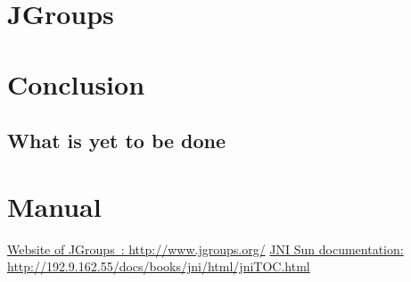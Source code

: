 \documentclass[a4paper,10pt]{report}
\begin{document}
\chapter{JGroups}
\section{}


\chapter{Conclusion}

\section{}

\section{What is yet to be done}

\chapter{Manual}


\listoffigures

\begin{thebibliography}{99}
   \href{http://www.jgroups.org/}{Website of JGroups~: http://www.jgroups.org/}
   \href{http://192.9.162.55/docs/books/jni/html/jniTOC.html}{JNI Sun documentation: http://192.9.162.55/docs/books/jni/html/jniTOC.html}
\end{thebibliography}
\end{document}
